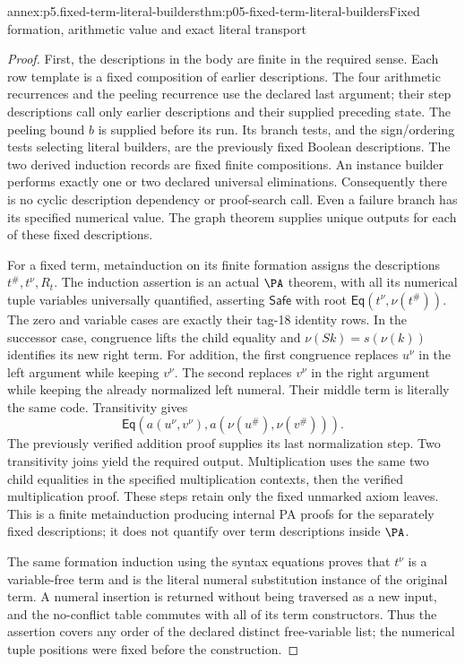 \begin{annexitem}{annex:p5.fixed-term-literal-builders}{thm:p05-fixed-term-literal-builders}{Fixed formation, arithmetic value and exact literal transport}
\begin{proof}
First, the descriptions in the body are finite in the required sense.
Each row template is a fixed composition of earlier descriptions. The four
arithmetic recurrences and the peeling recurrence use the declared last
argument; their step descriptions call only earlier descriptions and their
supplied preceding state. The peeling bound \(b\) is supplied before its
run. Its branch tests, and the sign/ordering tests selecting literal builders,
are the previously fixed Boolean descriptions. The two derived induction
records are fixed finite compositions. An instance builder performs exactly
one or two declared universal eliminations. Consequently there is no cyclic
description dependency or proof-search call. Even a failure branch has its
specified numerical value. The graph theorem supplies unique outputs for
each of these fixed descriptions.

For a fixed term, metainduction on its finite formation assigns the
descriptions \(t^\#,t^\nu,R_t\). The induction assertion is an actual
\(\PA\) theorem, with all its numerical tuple variables universally
quantified, asserting \(\mathsf{Safe}\) with root
\(\mathsf{Eq}(t^\nu,\nu(t^\#))\). The zero and variable cases are exactly
their tag-18 identity rows. In the successor case, congruence lifts the
child equality and \(\nu(Sk)=s(\nu(k))\) identifies its new right term.
For addition, the first congruence replaces \(u^\nu\) in the left
argument while keeping \(v^\nu\). The second replaces \(v^\nu\) in
the right argument while keeping the already normalized left numeral.
Their middle term is literally the same code. Transitivity gives
\[
 \mathsf{Eq}(a(u^\nu,v^\nu),a(\nu(u^\#),\nu(v^\#))).
\]
The previously verified addition proof supplies its last normalization
step. Two transitivity joins yield the required output. Multiplication
uses the same two child equalities in the specified multiplication contexts,
then the verified multiplication proof. These steps retain only the fixed
unmarked axiom leaves. This is a finite metainduction producing internal
PA proofs for the separately fixed descriptions; it does not quantify over
term descriptions inside \(\PA\).

The same formation induction using the syntax equations proves that
\(t^\nu\) is a variable-free term and is the literal numeral substitution
instance of the original term. A numeral insertion is returned without
being traversed as a new input, and the no-conflict table commutes with all
of its term constructors. Thus the assertion covers any order of the
declared distinct free-variable list; the numerical tuple positions were
fixed before the construction.


\end{proof}
\end{annexitem}

